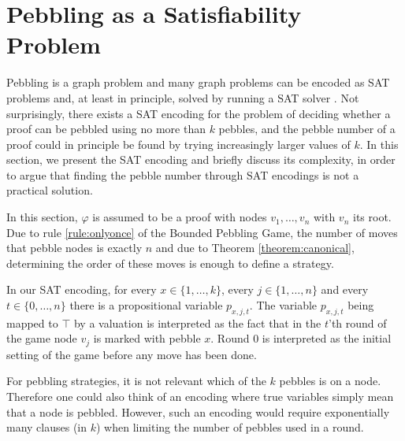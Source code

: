 \section{Pebbling as a Satisfiability Problem}
\label{sec:pebblingSAT}

Pebbling is a graph problem and many graph problems can be encoded as SAT problems and, at least in principle, solved by running a SAT solver \cite{ToDo: Handbook of Satisifiability?}.  
Not surprisingly, there exists a SAT encoding for the problem of deciding whether a proof can be pebbled using no more than $k$ pebbles, and the pebble number of a proof could in principle be found by trying increasingly larger values of $k$. In this section, we present the SAT encoding and briefly discuss its complexity, in order to argue that finding the pebble number through SAT encodings is not a practical solution.


In this section, $\varphi$ is assumed to be a proof with nodes $v_1,\ldots,v_n$ with $v_n$ its root. 
Due to rule \ref{rule:onlyonce} of the Bounded Pebbling Game, the number of moves that pebble nodes is exactly $n$ and due to Theorem \ref{theorem:canonical}, determining the order of these moves is enough to define a strategy. 

In our SAT encoding, for every $x \in \{1,\ldots,k\}$, every $j \in \{1,\ldots,n\}$ and every $t \in \{0,\ldots,n\}$ there is a propositional variable $p_{x,j,t}$. 
The variable $p_{x,j,t}$ being mapped to $\top$ by a valuation is interpreted as the fact that in the $t$'th round of the game node $v_j$ is marked with pebble $x$.
Round $0$ is interpreted as the initial setting of the game before any move has been done.

For pebbling strategies, it is not relevant which of the $k$ pebbles is on a node.
Therefore one could also think of an encoding where true variables simply mean that a node is pebbled.
However, such an encoding would require exponentially many clauses (in $k$) when limiting the number of pebbles used in a round.

